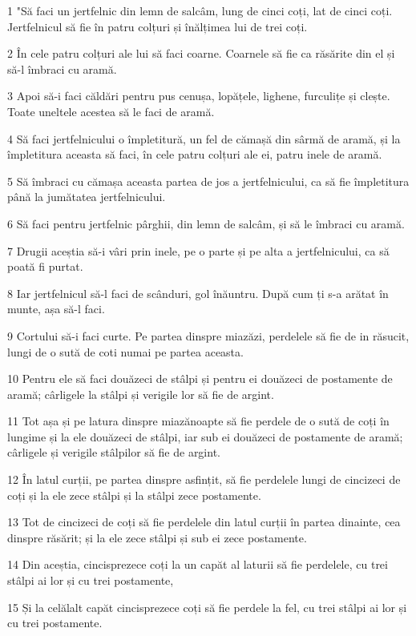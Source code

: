 \par 1 "Să faci un jertfelnic din lemn de salcâm, lung de cinci coți, lat de cinci coți. Jertfelnicul să fie în patru colțuri și înălțimea lui de trei coți.
\par 2 În cele patru colțuri ale lui să faci coarne. Coarnele să fie ca răsărite din el și să-l îmbraci cu aramă.
\par 3 Apoi să-i faci căldări pentru pus cenușa, lopățele, lighene, furculițe și clește. Toate uneltele acestea să le faci de aramă.
\par 4 Să faci jertfelnicului o împletitură, un fel de cămașă din sârmă de aramă, și la împletitura aceasta să faci, în cele patru colțuri ale ei, patru inele de aramă.
\par 5 Să îmbraci cu cămașa aceasta partea de jos a jertfelnicului, ca să fie împletitura până la jumătatea jertfelnicului.
\par 6 Să faci pentru jertfelnic pârghii, din lemn de salcâm, și să le îmbraci cu aramă.
\par 7 Drugii aceștia să-i vâri prin inele, pe o parte și pe alta a jertfelnicului, ca să poată fi purtat.
\par 8 Iar jertfelnicul să-l faci de scânduri, gol înăuntru. După cum ți s-a arătat în munte, așa să-l faci.
\par 9 Cortului să-i faci curte. Pe partea dinspre miazăzi, perdelele să fie de in răsucit, lungi de o sută de coti numai pe partea aceasta.
\par 10 Pentru ele să faci douăzeci de stâlpi și pentru ei douăzeci de postamente de aramă; cârligele la stâlpi și verigile lor să fie de argint.
\par 11 Tot așa și pe latura dinspre miazănoapte să fie perdele de o sută de coți în lungime și la ele douăzeci de stâlpi, iar sub ei douăzeci de postamente de aramă; cârligele și verigile stâlpilor să fie de argint.
\par 12 În latul curții, pe partea dinspre asfințit, să fie perdelele lungi de cincizeci de coți și la ele zece stâlpi și la stâlpi zece postamente.
\par 13 Tot de cincizeci de coți să fie perdelele din latul curții în partea dinainte, cea dinspre răsărit; și la ele zece stâlpi și sub ei zece postamente.
\par 14 Din aceștia, cincisprezece coți la un capăt al laturii să fie perdelele, cu trei stâlpi ai lor și cu trei postamente,
\par 15 Și la celălalt capăt cincisprezece coți să fie perdele la fel, cu trei stâlpi ai lor și cu trei postamente.

